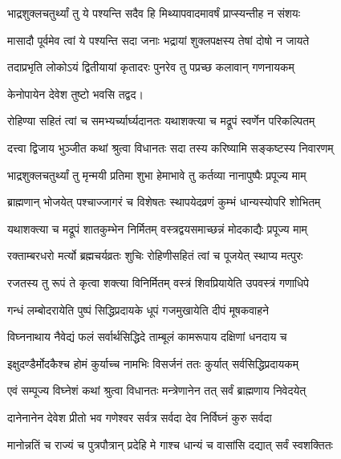 \twolineshloka
{भाद्रशुक्लचतुर्थ्यां तु ये पश्यन्ति सदैव हि}
{मिथ्यापवादमावर्षं प्राप्स्यन्तीह न संशयः}%

\twolineshloka
{मासादौ पूर्वमेव त्वां ये पश्यन्ति सदा जनाः}
{भद्रायां शुक्लपक्षस्य तेषां दोषो न जायते}%

\twolineshloka
{तदाप्रभृति लोकोऽयं द्वितीयायां कृतादरः}
{पुनरेव तु पप्रच्छ कलावान् गणनायकम्}%

{केनोपायेन देवेश तुष्टो भवसि तद्वद।}


\twolineshloka
{रोहिण्या सहितं त्वां च समभ्यर्च्यार्घ्यदानतः}
{यथाशक्त्या च मद्रूपं स्वर्णेन परिकल्पितम्}%

\twolineshloka
{दत्त्वा द्विजाय भुञ्जीत कथां श्रुत्वा विधानतः}
{सदा तस्य करिष्यामि सङ्कष्टस्य निवारणम्}%

\twolineshloka
{भाद्रशुक्लचतुर्थ्यां तु मृन्मयी प्रतिमा शुभा}
{हेमाभावे तु कर्तव्या नानापुष्पैः प्रपूज्य माम्}%

\twolineshloka
{ब्राह्मणान् भोजयेत् पश्चाज्जागरं च विशेषतः}
{स्थापयेदव्रणं कुम्भं धान्यस्योपरि शोभितम्}%

\twolineshloka
{यथाशक्त्या च मद्रूपं शातकुम्भेन निर्मितम्}
{वस्त्रद्वयसमाच्छन्नं मोदकाद्यैः प्रपूज्य माम्}%

\twolineshloka
{रक्ताम्बरधरो मर्त्यो ब्रह्मचर्यव्रतः शुचिः}
{रोहिणीसहितं त्वां च पूजयेत् स्थाप्य मत्पुरः}%

\twolineshloka
{रजतस्य तु रूपं ते कृत्वा शक्त्या विनिर्मितम्}
{वस्त्रं शिवप्रियायेति उपवस्त्रं गणाधिपे}%

\twolineshloka
{गन्धं लम्बोदरायेति पुष्पं सिद्धिप्रदायके}
{धूपं गजमुखायेति दीपं मूषकवाहने}%

\twolineshloka
{विघ्ननाथाय नैवेद्यं फलं सर्वार्थसिद्धिदे}
{ताम्बूलं कामरूपाय दक्षिणां धनदाय च}%

\twolineshloka
{इक्षुदण्डैर्मोदकैश्च होमं कुर्याच्च नामभिः}
{विसर्जनं ततः कुर्यात् सर्वसिद्धिप्रदायकम्}%

\twolineshloka
{एवं सम्पूज्य विघ्नेशं कथां श्रुत्वा विधानतः}
{मन्त्रेणानेन तत् सर्वं ब्राह्मणाय निवेदयेत्}%

\twolineshloka
{दानेनानेन देवेश प्रीतो भव गणेश्वर}
{सर्वत्र सर्वदा देव निर्विघ्नं कुरु सर्वदा}%

\twolineshloka
{मानोन्नतिं च राज्यं च पुत्रपौत्रान् प्रदेहि मे}
{गाश्च धान्यं च वासांसि दद्यात् सर्वं स्वशक्तितः}%

